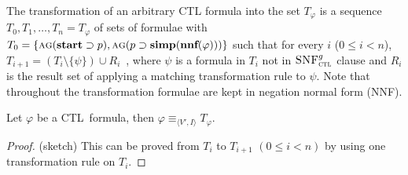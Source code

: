 \documentclass[runningheads]{llncs}
\newcommand{\tuple}[1]{{\langle{#1}\rangle}}
\newcommand{\start}{\textbf{start}}
\newcommand{\simp}{\textbf{simp}}
\newcommand{\nnf}{\textbf{nnf}}
\newcommand{\CTL}{\textrm{CTL}}
\newcommand{\ALL}{\textsc{a}}
\newcommand{\GLOBAL}{\textsc{g}}
\newcommand{\CTLsnf}{{\textsc{SNF}_{\textsc{ctl}}^g}}
\begin{document}
The transformation of an arbitrary CTL formula into the set $T_{\varphi}$ is a sequence $T_0, T_1,\dots, T_n=T_{\varphi}$ of sets of formulae with $T_0=\{\ALL \GLOBAL(\start \supset p), \ALL \GLOBAL(p \supset \simp(\nnf(\varphi)))\}$ such that for every $i$ ($0 \leq i< n$), $T_{i+1} = (T_i \setminus \{\psi\}) \cup R_i$~\cite{zhang2009refined}, where $\psi$ is a formula in $T_i$ not in $\CTLsnf$ clause and $R_i$ is the result set of applying a matching transformation rule to $\psi$. Note that throughout the transformation formulae are kept in negation normal form (NNF).
\begin{proposition}\label{pro:TranE}
 Let $\varphi$ be a \CTL\ formula, then $\varphi \equiv_{\tuple{V', I}} T_{\varphi}$.
\end{proposition}
\begin{proof} (sketch)
This can be proved from $T_i$ to $T_{i+1}$ $(0\leq i < n)$ by using one transformation rule on $T_i$.


\end{proof}
\end{document}
